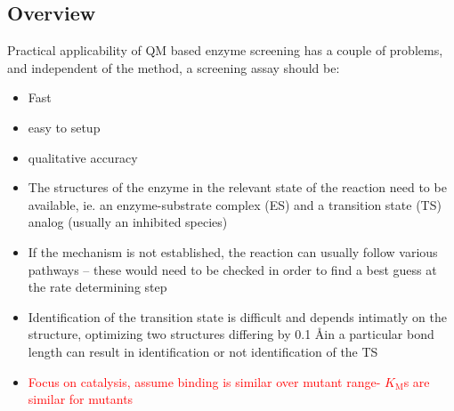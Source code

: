 \subsection{Overview}\label{sec:overview}
Practical applicability of QM based enzyme screening has a couple of problems, and independent of the method, a screening assay should be:
\begin{itemize}
\item Fast
\item easy to setup
\item qualitative accuracy
\item The structures of the enzyme in the relevant state of the reaction need to be available, ie. an enzyme-substrate complex (ES) and a transition state (TS) analog (usually an inhibited species)
\item If the mechanism is not established, the reaction can usually follow various pathways -- these would need to be checked in order to find a best guess at the rate determining step
\item Identification of the transition state is difficult and depends intimatly on the structure, optimizing two structures differing by 0.1 \AA in a particular bond length can result in identification or not identification of the TS
\item \textcolor{red}{Focus on catalysis, assume binding is similar over mutant range\cite{ludwiczek2013strategies}- $K_\text{M}$s are similar for mutants}
\end{itemize}

\clearpage
